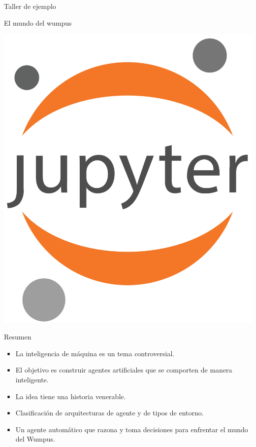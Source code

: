 \documentclass[11pt]{beamer}
\begin{document}
\begin{frame}{Taller de ejemplo}

\begin{center}
El mundo del wumpus

\includegraphics[scale=.0.5]{imagenes/Jupyter_logo}

\url{}
\end{center}

\end{frame}

\begin{frame}{Resumen}

\begin{itemize}
\item La inteligencia de máquina es un tema controversial.
\item El objetivo es construir agentes artificiales que se comporten de manera inteligente.
\item La idea tiene una historia venerable.
\item Clasificación de arquitecturas de agente y de tipos de entorno.
\item Un agente automático que razona y toma decisiones para enfrentar el mundo del Wumpus.
\end{itemize}

\end{frame}
\end{document}

